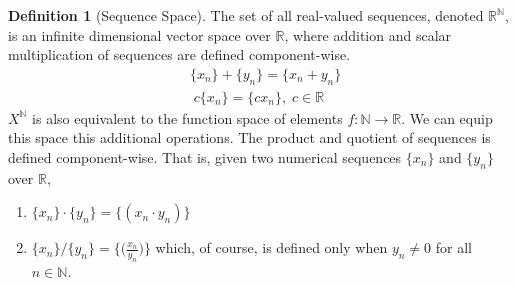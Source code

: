 \documentclass{article}
\theoremstyle{remark}
\theoremstyle{definition}
\newtheorem{definition}{Definition}[section]
\begin{document}
\begin{definition}[Sequence Space]
The set of all real-valued sequences, denoted $\mathbb{R}^\mathbb{N}$, is an infinite dimensional vector space over $\mathbb{R}$, where addition and scalar multiplication of sequences are defined component-wise. 
\begin{align*}
    &\{x_n\} + \{y_n\} = \{x_n + y_n\}\\
    &\; c \{x_n\} = \{c x_n\}, \; c \in \mathbb{R}
\end{align*}
$X^\mathbb{N}$ is also equivalent to the function space of elements $f: \mathbb{N} \longrightarrow \mathbb{R}$. We can equip this space this additional operations. The product and quotient of sequences is defined component-wise. That is, given two numerical sequences $\{x_n\}$ and $\{y_n\}$ over $\mathbb{R}$, 
\begin{enumerate}
    \item $\{x_n\} \cdot \{y_n\} = \{(x_n \cdot y_n)\}$
    \item $\{x_n\} / \{y_n\} = \Big\{ \Big(\frac{x_n}{y_n}\Big) \Big\}$ which, of course, is defined only when $y_n \neq 0$ for all $n \in \mathbb{N}$. 
\end{enumerate}
\end{definition}
\end{document}
